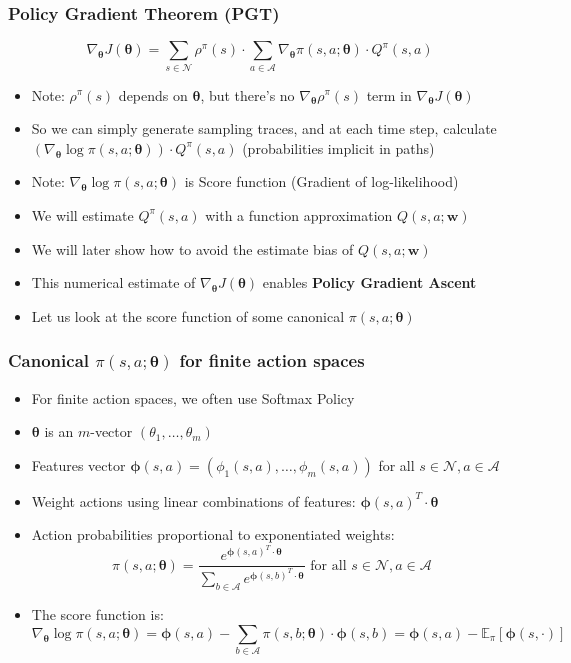 \documentclass[handout]{beamer}
\begin{document}
\begin{frame}
\frametitle{Policy Gradient Theorem (PGT)}
\pause
\begin{theorem}
$$\nabla_{\bm{\theta}} J(\bm{\theta}) = \sum_{s \in \mathcal{N}} \rho^{\pi}(s) \cdot \sum_{a \in \mathcal{A}} \nabla_{\bm{\theta}} \pi(s,a; \bm{\theta}) \cdot Q^{\pi}(s,a)$$
\end{theorem}
\pause
\begin{itemize}[<+->]
\item Note: $\rho^{\pi}(s)$ depends on $\bm{\theta}$, but there's no $\nabla_{\bm{\theta}} \rho^{\pi}(s)$ term in $\nabla_{\bm{\theta}} J(\bm{\theta})$
\item So we can simply generate sampling traces, and at each time step, calculate $(\nabla_{\bm{\theta}} \log{\pi(s,a; \bm{\theta})}) \cdot Q^{\pi}(s,a)$ (probabilities implicit in paths)
\item Note: $\nabla_{\bm{\theta}} \log{\pi(s,a; \bm{\theta})}$ is Score function (Gradient of log-likelihood)
\item We will estimate $Q^{\pi}(s,a)$ with a function approximation $Q(s,a;\bm{w})$
\item We will later show how to avoid the estimate bias of $Q(s,a;\bm{w})$
\item This numerical estimate of $\nabla_{\bm{\theta}} J(\bm{\theta})$ enables {\bf Policy Gradient Ascent}
\item Let us look at the score function of some canonical $\pi(s,a; \bm{\theta})$
\end{itemize}
\end{frame}

\begin{frame}
\frametitle{Canonical $\pi(s,a; \bm{\theta})$ for finite action spaces}
\pause
\begin{itemize}[<+->]
\item For finite action spaces, we often use Softmax Policy
\item $\bm{\theta}$ is an $m$-vector $(\theta_1, \ldots, \theta_m)$
\item Features vector $\bm{\phi}(s,a) = (\phi_1(s,a), \ldots, \phi_m(s,a))$ for all $s \in \mathcal{N}, a \in \mathcal{A}$
\item Weight actions using linear combinations of features: $\bm{\phi}(s,a)^T \cdot \bm{\theta}$
\item Action probabilities proportional to exponentiated weights:
$$\pi(s,a; \bm{\theta}) = \frac {e^{\bm{\phi}(s,a)^T \cdot \bm{\theta}}} {\sum_{b \in \mathcal{A}} e^{\bm{\phi}(s,b)^T \cdot \bm{\theta}}} \mbox{ for all } s \in \mathcal{N}, a \in \mathcal{A}$$
\item The score function is:
$$\nabla_{\bm{\theta}} \log \pi(s,a; \bm{\theta}) = \bm{\phi}(s,a) - \sum_{b \in \mathcal{A}} \pi(s,b; \bm{\theta}) \cdot \bm{\phi}(s,b) = \bm{\phi}(s,a) - \mathbb{E}_{\pi}[\bm{\phi}(s,\cdot)]$$
\end{itemize}
\end{frame}
\end{document}
